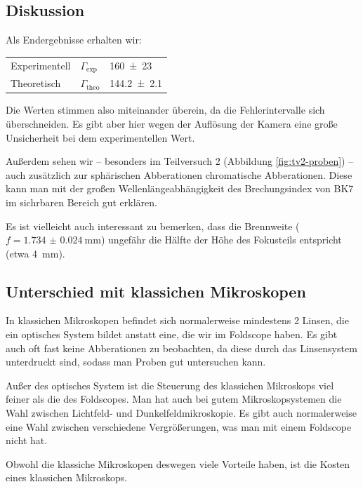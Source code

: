 	\subsection{Diskussion}
		Als Endergebnisse erhalten wir:
		\begin{center}
			\begin{tabular}{lll}
				\toprule
				Experimentell & $\Gamma_\text{exp}$ & \num{160(23)} \\
				Theoretisch & $\Gamma_\text{theo}$ & \num{144.2(21)} \\
				\bottomrule
			\end{tabular}
		\end{center}
		Die Werten stimmen also miteinander überein, da die Fehlerintervalle sich überschneiden. Es gibt aber hier wegen der Auflösung der Kamera eine große Unsicherheit bei dem experimentellen Wert.

		Außerdem sehen wir -- besonders im Teilversuch 2 (Abbildung \ref{fig:tv2-proben}) -- auch zusätzlich zur sphä\-rischen Abberationen chromatische Abberationen. Diese kann man mit der großen Wel\-len\-län\-ge\-ab\-hän\-gig\-keit des Brechungsindex von BK7 im sichrbaren Bereich gut erklären. 

		Es ist vielleicht auch interessant zu bemerken, dass die Brennweite ($f = \SI{1.734(24)}{\milli\meter}$) ungefähr die Hälfte der Höhe des Fokusteils entspricht (etwa \SI{4}{\milli\meter}). 

	\subsection{Unterschied mit klassichen Mikroskopen}
		In klassichen Mikroskopen befindet sich normalerweise mindestens 2 Linsen, die ein optisches System bildet anstatt eine, die wir im Foldscope haben. Es gibt auch oft fast keine Abberationen zu beobachten, da diese durch das Linsensystem unterdruckt sind, sodass man Proben gut untersuchen kann. 

		Außer des optisches System ist die Steuerung des klassichen Mikroskops viel feiner als die des Foldscopes. Man hat auch bei gutem Mikroskopsystemen die Wahl zwischen Lichtfeld- und Dunkelfeldmikroskopie. Es gibt auch normalerweise eine Wahl zwischen verschiedene Vergrößerungen, was man mit einem Foldscope nicht hat. 

		Obwohl die klassiche Mikroskopen deswegen viele Vorteile haben, ist die Kosten eines klassichen Mikroskops. 
